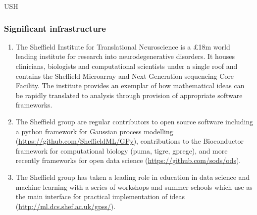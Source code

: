 \begin{sitedescription}{USH}
\subsubsection*{Significant infrastructure}
\begin{enumerate}
\item The Sheffield Institute for Translational Neuroscience is a \pounds 18m world leading institute for research into neurodegenerative disorders. It houses clinicians, biologists and computational scientists under a single roof and contains the Sheffield Microarray and Next Generation sequencing Core Facility. The institute provides an exemplar of how mathematical ideas can be rapidly translated to analysis through provision of appropriate software frameworks.
\item The Sheffield group are regular contributors to open source software including a python framework for Gaussian process modelling (\url{https://github.com/SheffieldML/GPy}), contributions to the Bioconductor framework for computational biology (puma, tigre, gprege), and more recently frameworks for open data science (\url{https://github.com/sods/ods}).  
\item The Sheffield group has taken a leading role in education in data science and machine learning with a series of workshops and summer schools which use \Jupyter as the main interface for practical implementation of ideas (\url{http://ml.dcs.shef.ac.uk/gpss/}).

\end{enumerate}
\end{sitedescription}


